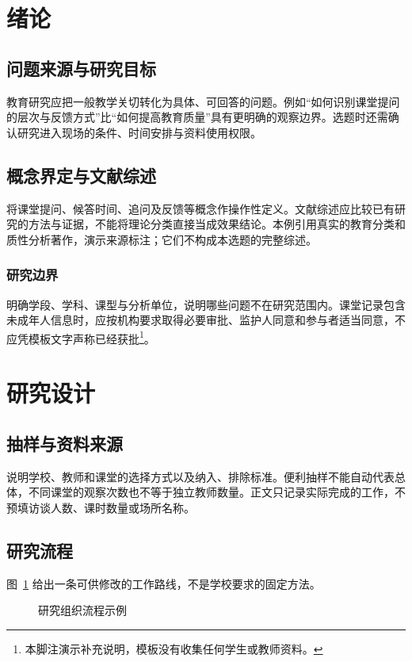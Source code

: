 \section{绪论}
\subsection{问题来源与研究目标}
教育研究应把一般教学关切转化为具体、可回答的问题。例如“如何识别课堂提问的层次与反馈方式”比“如何提高教育质量”具有更明确的观察边界。选题时还需确认研究进入现场的条件、时间安排与资料使用权限。
\subsection{概念界定与文献综述}
将课堂提问、候答时间、追问及反馈等概念作操作性定义。文献综述应比较已有研究的方法与证据，不能将理论分类直接当成效果结论。本例引用真实的教育分类和质性分析著作，演示来源标注\cite{anderson2001,braun2006}；它们不构成本选题的完整综述。
\subsubsection{研究边界}
明确学段、学科、课型与分析单位，说明哪些问题不在研究范围内。课堂记录包含未成年人信息时，应按机构要求取得必要审批、监护人同意和参与者适当同意，不应凭模板文字声称已经获批\footnote{本脚注演示补充说明，模板没有收集任何学生或教师资料。}。
\section{研究设计}
\subsection{抽样与资料来源}
说明学校、教师和课堂的选择方式以及纳入、排除标准。便利抽样不能自动代表总体，不同课堂的观察次数也不等于独立教师数量。正文只记录实际完成的工作，不预填访谈人数、课时数量或场所名称。
\subsection{研究流程}
图~\ref{fig:education} 给出一条可供修改的工作路线，不是学校要求的固定方法。
\begin{figure}[htbp]\centering
{}
\caption{研究组织流程示例}\label{fig:education}
\end{figure}
